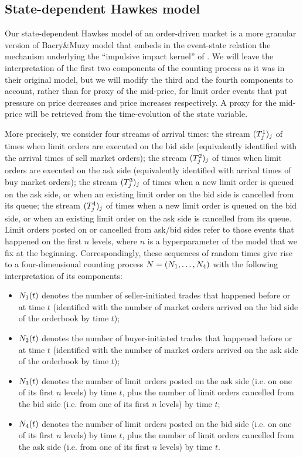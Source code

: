 \documentclass[10pt, article,table]{article}
\begin{document}
\subsection{State-dependent Hawkes model}\label{sec.sdHawkes_model}
Our state-dependent Hawkes model of an order-driven market is a more granular version of Bacry\&Muzy model that embeds in the event-state relation the mechanism underlying the ``impulsive impact kernel'' of \citealp{BM14haw}.
We will leave the interpretation of the first two components of the counting process as it was in their original model, but we will modify the third and the fourth components to account, rather than for proxy of the mid-price, for limit order events that put pressure on price decreases and price increases respectively. A proxy for the mid-price will be retrieved from the time-evolution of the state variable. 

More precisely, we consider four streams of arrival times: the stream $(\arrivalTimes[1]_j)_j$ of times when limit orders are executed on the bid side (equivalently identified with the arrival times of sell market orders); the stream  $(\arrivalTimes[2]_j)_j$ of times when limit orders are executed on the ask side (equivalently identified with arrival times of buy market orders); the stream  $(\arrivalTimes[3]_j)_j$ of times when a new limit order is queued on the ask side, or when an existing limit order on the bid side is cancelled from its queue; the stream  $(\arrivalTimes[4]_j)_j$ of times when a new limit order is queued on the bid side, or when an existing limit order on the ask side is cancelled from its queue. Limit orders posted on or cancelled from ask/bid sides refer to those events that happened on the first $n$ levels, where $n$ is a hyperparameter of the model that we fix at the beginning. Correspondingly, these sequences of random times give rise to a four-dimensional counting process $\multiCountingProc=(\countingProc[1],\dots, \countingProc[4])$ with the following interpretation of its components:
\begin{itemize}
 \item $\countingProc[1](t)$ denotes the number of seller-initiated trades that happened before or at time $t$ (identified with the number of market orders arrived on the bid side of the orderbook by time $t$);
 \item $\countingProc[2](t)$ denotes the number of buyer-initiated trades that happened before or at time $t$ (identified with the number of market orders arrived on the ask side of the orderbook by time $t$);
 \item $\countingProc[3](t)$ denotes the number of limit orders posted on the ask side (i.e. on one of its first $n$ levels) by time $t$, plus the number of limit orders cancelled from the bid side (i.e. from one of its first $n$ levels) by time $t$;
 \item $\countingProc[4](t)$ denotes the number of limit orders posted on the bid side (i.e. on one of its first $n$ levels) by time $t$, plus the number of limit orders cancelled from the ask side (i.e. from one of its first $n$ levels) by time $t$.
\end{itemize}
\end{document}

